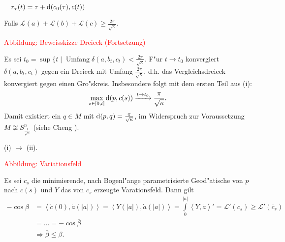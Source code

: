 \begin{emptythm}
\begin{description}[font=\normalfont\bfseries]
\begin{center}
$\quad r_\tau(t) = \tau + \mathrm{d} (c_0(\tau), c(t))$\end{center}
  \end{description}


  Falls $\mathcal L(a) + \mathcal L(b) + \mathcal L(c) \geq \frac{2\pi}{\sqrt{\kappa}}$.

  \begin{center}
    \textcolor{red}{Abbildung: Beweisskizze Dreieck (Fortsetzung)}
  \end{center}

  Es sei $t_0 = \sup \{t \mid \operatorname{Umfang} \delta(a,b_t,c_t) < \frac{2\pi}{\sqrt{\kappa}}$.
  F"ur $t \to t_0$ konvergiert $\delta(a,b_t,c_t)$ gegen ein Dreieck mit Umfang $\frac{2\pi}{\sqrt{\kappa}}$, d.h. das Vergleichsdreieck konvergiert gegen einen Gro"skreis.
  Insbesondere folgt mit dem ersten Teil aus (i):
  \begin{align*}
    \max\limits_{s \in [0,t]} \mathrm{d}(p,c(s)) \xrightarrow{t \to t_0} \frac{\pi}{\sqrt{\kappa}}.
  \end{align*}
  Damit existiert ein $q \in M$ mit $\mathrm{d}(p,q) = \frac{\pi}{\sqrt{\kappa}}$, im Widerspruch zur Voraussetzung $M \not\cong S^n_{\frac{1}{\sqrt{\kappa}}}$ (siehe Cheng \cite{Cheng1975}).

  (i) $\to$ (ii).
  \begin{center}
    \textcolor{red}{Abbildung: Variationsfeld}
  \end{center}

  Es sei $c_s$ die minimierende, nach Bogenl"ange parametrisierte Geod"atische von $p$ nach $c(s)$ und $Y$ das von $c_s$ erzeugte Varationsfeld.
  Dann gilt
  \begin{align*}
    - \cos \beta & = \left<\dot c(0), \dot a(|a|)\right> 
    = \left<Y(|a|), \dot a(|a|) \right>
    = \int\limits_0^{|a|} \left<Y, \dot a\right>'
    = \mathcal L'(c_s) \geq \mathcal L'(\overline c_s)\\
    & = \ldots 
    = -\cos \overline \beta\\
    & \Rightarrow \overline \beta \leq \beta.
  \end{align*}
\end{emptythm}


